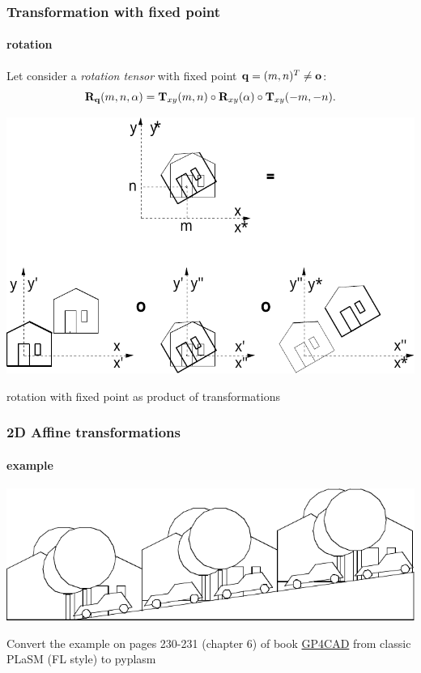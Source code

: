 \documentclass{beamer}
\begin{document}
\begin{frame}\frametitle{Transformation with fixed point}
\framesubtitle{rotation}


\vfill
Let consider a \emph{rotation tensor} with fixed point ${\bf q} =
(m,n)^{T} \not= {\bf o}$:
\[
{\bf R}_{{\bf q}}(m, n, \alpha)
={\bf T}_{xy}(m, n)\circ {\bf R}_{xy}(\alpha)\circ {\bf T}_{xy}(-m, -n) .
\]

\vfill

\begin{center}
\includegraphics[width=0.7\linewidth]{images/rotfisso}
\end{center}

\vfill
rotation with fixed point as product of transformations

\end{frame}
\begin{frame}[fragile]
\frametitle{2D Affine transformations}
\framesubtitle{example}

\centering\includegraphics[width=0.8\linewidth]{images/InclinedTriple}

\vfill

\begin{remark}[Assignment]
Convert the example on pages 230-231 (chapter 6) of book \href{http://onlinelibrary.wiley.com/book/10.1002/0470013885}{\color{cyan} GP4CAD} from classic PLaSM (FL style) to \alert{pyplasm} \end{remark}

\end{frame}
\end{document}
